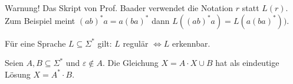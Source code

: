 Warnung! Das Skript von Prof. Baader verwendet die Notation $r$ statt $L(r)$.
Zum Beispiel meint $(ab)^\ast a=a(ba)^\ast$ dann $L((ab)^\ast a)=L(a(ba)^\ast))$.

\begin{satz}[Kleene]\label{satz5.5Kleene}\enter
	Für eine Sprache $L\subseteq\Sigma^\ast$ gilt: $L$ regulär $\Longleftrightarrow L$ erkennbar.
\end{satz}

\begin{lemma}[Arden]\label{lemma5.7Arden}\enter
	Seien $A,B\subseteq\Sigma^\ast$ und $\varepsilon\not\in A$.
	Die Gleichung $X=A\cdot X\cup B$ hat als eindeutige Lösung $X=A^\ast\cdot B$.
\end{lemma}
